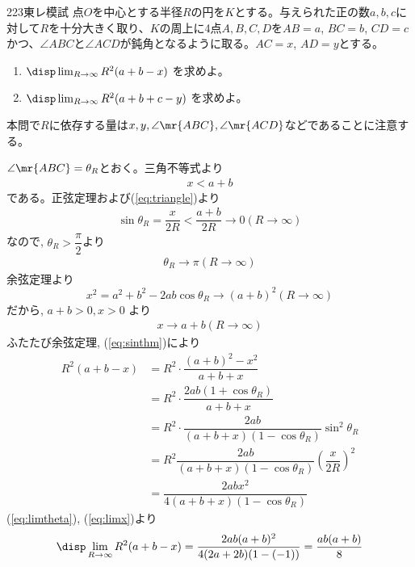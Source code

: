 \begin{prob}{223}{}{東レ模試}
 点$O$を中心とする半径$R$の円を$K$とする。与えられた正の数$a, b, c$に対して$R$を十分大きく取り、$K$の周上に4点$A, B, C, D$を$AB=a$, $BC=b$, $CD=c$かつ、$\angle{ABC}$と$\angle{ACD}$が鈍角となるように取る。$AC=x$, $AD=y$とする。
 \begin{enumerate}
  \item $\disp \lim_{R\to\infty} R^2(a+b-x)$ を求めよ。
  \item $\disp \lim_{R\to\infty} R^2(a+b+c-y)$ を求めよ。
 \end{enumerate}
\end{prob}
本問で$R$に依存する量は$x,y,\angle{\mr{ABC}},\angle{\mr{ACD}}$などであることに注意する。

$\angle{\mr{ABC}}=\theta_R$とおく。三角不等式より
\begin{eqnarray}
x<a+b\label{eq:triangle}
\end{eqnarray}
である。正弦定理および(\ref{eq:triangle})より
\begin{eqnarray}
\sin{\theta_R}=\dfrac{x}{2R}<\dfrac{a+b}{2R} \to 0　(R\to\infty)\label{eq:sinthm}
\end{eqnarray}
なので, $\theta_R>\dfrac{\pi}{2}$より
\begin{eqnarray}
\theta_R\to\pi　(R\to\infty)\label{eq:limtheta}
\end{eqnarray}
余弦定理より
\[x^2=a^2+b^2-2ab\cos{\theta_R}\to (a+b)^2　(R\to\infty)\]
だから, $a+b>0, x>0$ より 
\begin{eqnarray}
x\to a+b　(R\to\infty)\label{eq:limx}
\end{eqnarray}
ふたたび余弦定理, (\ref{eq:sinthm})により
\begin{align*}
 R^2(a+b-x)&=R^2\cdot\dfrac{(a+b)^2-x^2}{a+b+x}\\
 &=R^2\cdot\dfrac{2ab(1+\cos{\theta_R})}{a+b+x}\\
 &= R^2\cdot\dfrac{2ab}{(a+b+x)(1-\cos{\theta_R})}\sin^2{\theta_R}\\
 &= R^2\dfrac{2ab}{(a+b+x)(1-\cos{\theta_R})}\left(\dfrac{x}{2R}\right)^2\\
 &= \dfrac{2abx^2}{4(a+b+x)(1-\cos{\theta_R})}
\end{align*}
(\ref{eq:limtheta}), (\ref{eq:limx})より
\[\disp\lim_{R\to\infty}R^2(a+b-x)=\dfrac{2ab(a+b)^2}{4(2a+2b)(1-(-1))}=\dfrac{ab(a+b)}{8}\]

